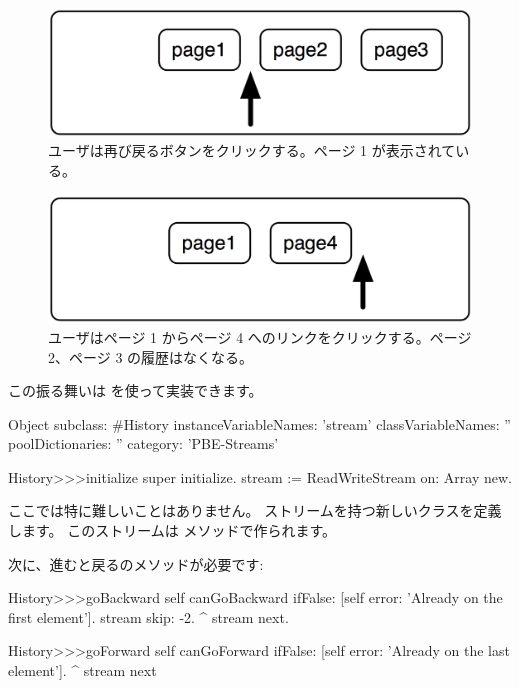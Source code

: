 \documentclass[a4paper,10pt,twoside]{book}
\begin{document}
\begin{figure}[!ht]
\centerline{\includegraphics[scale=0.5]{page1_Stef}}
\caption{ユーザは再び戻るボタンをクリックする。ページ 1 が表示されている。}
\vspace{.2in}
\end{figure}

\begin{figure}[!ht]
\centerline{\includegraphics[scale=0.5]{page4Stef}}
\caption{ユーザはページ 1 からページ 4 へのリンクをクリックする。ページ 2、ページ 3 の履歴はなくなる。}
\vspace{.2in}
\end{figure}

この振る舞いは  を使って実装できます。

\begin{code}{}
Object subclass: #History
  instanceVariableNames: 'stream'
  classVariableNames: ''
  poolDictionaries: ''
  category: 'PBE-Streams'

History>>>initialize
    super initialize.
    stream := ReadWriteStream on: Array new.
\end{code}

ここでは特に難しいことはありません。
ストリームを持つ新しいクラスを定義します。
このストリームは  メソッドで作られます。

次に、進むと戻るのメソッドが必要です:

\begin{code}{}
History>>>goBackward
  self canGoBackward ifFalse: [self error: 'Already on the first element'].
  stream skip: -2.
  ^ stream next.

History>>>goForward
  self canGoForward ifFalse: [self error: 'Already on the last element'].
  ^ stream next
\end{code}
\end{document}
